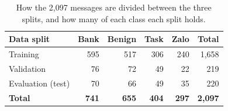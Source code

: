 \begin{table}[H]
\centering
\small
\renewcommand{\arraystretch}{1.16}
\begin{tabular}{L{3.4cm}rrrrr}
\toprule
\textbf{Data split} & \textbf{Bank} & \textbf{Benign} & \textbf{Task} & \textbf{Zalo} & \textbf{Total} \\
\midrule
Training            & 595 & 517 & 306 & 240 & 1{,}658 \\
Validation          &  76 &  72 &  49 &  22 &   219 \\
Evaluation (test) &  70 &  66 &  49 &  35 &   220 \\
\midrule
\textbf{Total} & \textbf{741} & \textbf{655} & \textbf{404} & \textbf{297} & \textbf{2{,}097} \\
\bottomrule
\end{tabular}

\caption{How the 2{,}097 messages are divided between the three splits, and how many of each class each split holds.}
\label{tab:dataset-stats}
\end{table}
